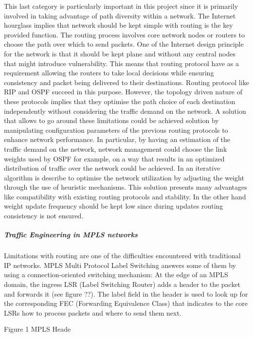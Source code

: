 This last category is particularly important in this project since it is primarily involved in taking advantage of path diversity within a network. The Internet hourglass implies that network should be kept simple with routing is the key provided function. The routing process involves core network nodes or routers to choose the path over which to send packets. One of the Internet design principle  for the network is that it should be kept plane and without any central nodes that might introduce  vulnerability. This means that routing protocol have as a requirement allowing the routers to take local decisions while ensuring consistency and packet being delivered to their destinations. Routing protocol like RIP and OSPF succeed in this purpose. However, the topology driven nature of these protocols implies that they optimise the path choice of each destination independently without considering the traffic demand on the network.  A solution that allows to go around these limitations could be achieved solution by manipulating configuration parameters of the previous routing protocols to enhance network performance.  In particular, by having an estimation of the traffic demand on the network, network management could choose the link weights  used by OSPF for example, on a way that results in an optimized distribution of traffic over the network could be achieved. In \cite{Fortz2000} an iterative algorithm is describe to optimise the network utilization by adjusting the weight through the use of heuristic mechanisms. This solution presents many advantages like compatibility with existing routing protocols and stability. In the other hand weight update frequency should be kept low since during updates routing consistency is not ensured.

\subparagraph{Traffic Engineering in MPLS networks}

Limitations with routing are one of the difficulties encountered with traditional IP networks. MPLS  Multi Protocol Label Switching answers some of them by using a connection-oriented switching mechanism:  At the edge of an MPLS domain, the ingress LSR (Label Switching Router) adds a header to the packet and forwards it (see figure ??). The label field in the header is used to look up for the corresponding FEC (Forwarding Equivalence Class) that indicates to the core LSRs how to process packets and where to send them next. 


Figure 1 MPLS Heade

